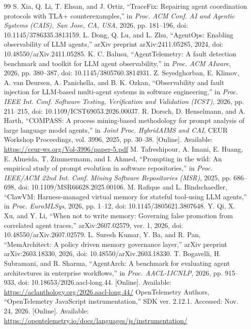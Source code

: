 \begin{thebibliography}{99}
 S. Xia, Q. Li, T. Ehsan, and J. Ortiz, ``TraceFix: Repairing agent coordination protocols with TLA+ counterexamples,'' in \emph{Proc. ACM Conf. AI and Agentic Systems (CAIS), San Jose, CA, USA}, 2026, pp. 181--196, doi: 10.1145/3786335.3813159.
 L. Dong, Q. Lu, and L. Zhu, ``AgentOps: Enabling observability of LLM agents,'' arXiv preprint arXiv:2411.05285, 2024, doi: 10.48550/arXiv.2411.05285.
 K. C. Balusu, ``AgentTelemetry: A fault detection benchmark and toolkit for LLM agent observability,'' in \emph{Proc. ACM AIware}, 2026, pp. 380--387, doi: 10.1145/3805760.3814931.
 Z. Seyedghorban, E. Klimov, A. van Deursen, A. Panichella, and B. K. Ozkan, ``Observability and fault injection for LLM-based multi-agent systems in software engineering,'' in \emph{Proc. IEEE Int. Conf. Software Testing, Verification and Validation (ICST)}, 2026, pp. 211--215, doi: 10.1109/ICST69053.2026.00037.
 R. Dorsch, D. Henselmann, and A. Harth, ``COMPASS: A process mining-based methodology for prompt analysis of large language model agents,'' in \emph{Joint Proc. HybridAIMS and CAI}, CEUR Workshop Proceedings, vol. 3996, 2025, pp. 30--38. [Online]. Available: \url{https://ceur-ws.org/Vol-3996/paper-5.pdf}
 M. Tafreshipour, A. Imani, E. Huang, E. Almeida, T. Zimmermann, and I. Ahmed, ``Prompting in the wild: An empirical study of prompt evolution in software repositories,'' in \emph{Proc. IEEE/ACM 22nd Int. Conf. Mining Software Repositories (MSR)}, 2025, pp. 686--698, doi: 10.1109/MSR66628.2025.00106.
 M. Rafique and L. Bindschaedler, ``ClawVM: Harness-managed virtual memory for stateful tool-using LLM agents,'' in \emph{Proc. EuroMLSys}, 2026, pp. 1--12, doi: 10.1145/3805621.3807648.
 Y. Qi, X. Xu, and Y. Li, ``When not to write memory: Governing false promotion from correlated agent traces,'' arXiv:2607.02579, ver. 1, 2026, doi: 10.48550/arXiv.2607.02579.
 L. Suresh Kumar, Y. Ba, and R. Pan, ``MemArchitect: A policy driven memory governance layer,'' arXiv preprint arXiv:2603.18330, 2026, doi: 10.48550/arXiv.2603.18330.
 T. Bogavelli, H. Subramani, and R. Sharma, ``AgentArch: A benchmark for evaluating agent architectures in enterprise workflows,'' in \emph{Proc. AACL-IJCNLP}, 2026, pp. 915--933, doi: 10.18653/2026.aacl-long.44. [Online]. Available: \url{https://aclanthology.org/2026.aacl-long.44/}
 OpenTelemetry Authors, ``OpenTelemetry JavaScript instrumentation,'' SDK ver. 2.12.1. Accessed: Nov. 24, 2026. [Online]. Available: \url{https://opentelemetry.io/docs/languages/js/instrumentation/}

\end{thebibliography}
